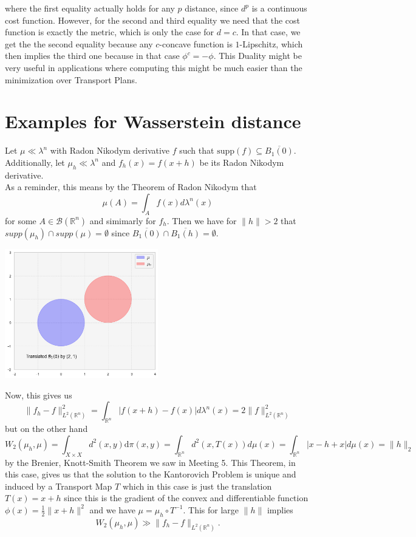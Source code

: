 \documentclass[15pt]{article}
\newcommand{\R}{\mathbb{R}}
\begin{document}
where the first equality actually holds for any $p$ distance, since $d^p$ is a continuous cost function. 
However, for the second and third equality we need that the cost function is exactly the metric, which is only the case for $d = c$. 
In that case, we get the the second equality because any $c$-concave function is $1$-Lipschitz, which then implies the third one because in that case $\phi^c = -\phi$.
This Duality might be very useful in applications where computing this might be much easier than the minimization over Transport Plans. 


\section*{Examples for Wasserstein distance}
Let $\mu \ll \lambda^n$ with Radon Nikodym derivative $f$ such that $\text{supp}(f) \subseteq \overline{B_1(0)}$. \\ 
Additionally, let $\mu_h \ll \lambda^n$ and $f_h(x) = f(x+h)$ be its Radon Nikodym derivative. \\
As a reminder, this means by the Theorem of Radon Nikodym that $$\mu(A) = \int_{A} f(x) d\lambda^n(x)$$ for some $A \in \mathcal{B}(\R^n)$ and simimarly for $f_h$. 
Then we have for $\|h\| > 2$ that $supp(\mu_h) \cap supp(\mu) = \emptyset$ since $\overline{B_1(0)} \cap \overline{B_1(h)} = \emptyset$. 
\begin{center}
  \includegraphics*[width=0.5\textwidth]{BALL.png}  
\end{center}

Now, this gives us 
$$\|f_h-f\|^2_{L^2(\mathbb{R}^n)} = \int_{\mathbb{R}^n} |f(x+h)-f(x)| d\lambda^n(x) =2\|f\|_{L^2(\mathbb{R}^n)}^2 $$
but on the other hand $$W_2(\mu_h,\mu) = \int_{X\times X}d^2(x,y)\mathrm{d}\pi(x,y) = \int_{\R^n} d^2(x,T(x))  d\mu(x) = \int_{\R^n} |x-h+x| d\mu(x) = \|h\|_2$$ by the Brenier, Knott-Smith Theorem we saw in Meeting 5. 
This Theorem, in this case, gives us that the solution to the Kantorovich Problem is unique and induced by a Transport Map $T$ which in this case is just the translation $T(x) = x+h$ since this is the gradient of the convex and differentiable function $\phi(x) = \frac{1}{2}\|x+h\|^2$ and we have $\mu = \mu_h \circ T^{-1}$. This for large $\|h\|$ implies $$W_2(\mu_h,\mu) \gg \|f_h-f\|_{L^2(\mathbb{R}^n)}.$$ 
\end{document}
